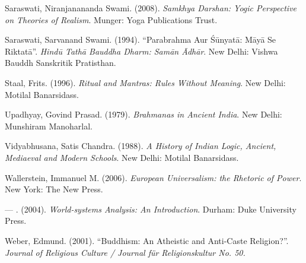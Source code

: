 \begin{thebibliography}{99}
  Saraswati, Niranjanananda Swami. (2008). \textit{Samkhya Darshan: Yogic Perspective on Theories of Realism}. Munger: Yoga Publications Trust.

  Saraswati, Sarvanand Swami. (1994). “Parabrahma Aur Śūnyatā: Māyā Se Riktatā”. \textit{Hindū Tathā Bauddha Dharm: Samān Ādhār}. New Delhi: Vishwa Bauddh Sanskritik Pratisthan.

  Staal, Frits. (1996). \textit{Ritual and Mantras: Rules Without Meaning}. New Delhi: Motilal Banarsidass.

  Upadhyay, Govind Prasad. (1979). \textit{Brahmanas in Ancient India}. New Delhi: Munshiram Manoharlal.

  Vidyabhusana, Satis Chandra. (1988). \textit{A History of Indian Logic, Ancient, Mediaeval and Modern Schools}. New Delhi: Motilal Banarsidass.

  Wallerstein, Immanuel M. (2006). \textit{European Universalism: the Rhetoric of Power}. New York: The New Press.

  --- . (2004). \textit{World-systems Analysis: An Introduction}. Durham: Duke University Press.

  Weber, Edmund. (2001). “Buddhism: An Atheistic and Anti-Caste Religion?”. \textit{Journal of Religious Culture / Journal für Religionskultur No. 50.}

 \end{thebibliography}

\theendnotes

